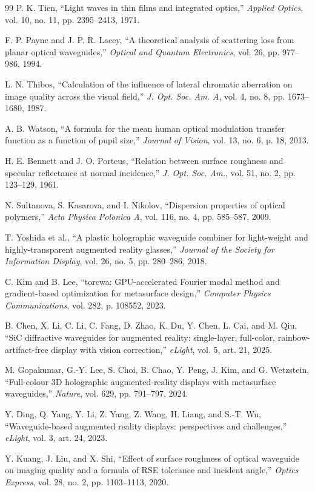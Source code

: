 \documentclass[10pt,twocolumn]{article}
\begin{document}
\begin{thebibliography}{99}
 P. K. Tien, ``Light waves in thin films and integrated optics,'' \emph{Applied Optics}, vol. 10, no. 11, pp. 2395--2413, 1971.

 F. P. Payne and J. P. R. Lacey, ``A theoretical analysis of scattering loss from planar optical waveguides,'' \emph{Optical and Quantum Electronics}, vol. 26, pp. 977--986, 1994.

 L. N. Thibos, ``Calculation of the influence of lateral chromatic aberration on image quality across the visual field,'' \emph{J. Opt. Soc. Am. A}, vol. 4, no. 8, pp. 1673--1680, 1987.

 A. B. Watson, ``A formula for the mean human optical modulation transfer function as a function of pupil size,'' \emph{Journal of Vision}, vol. 13, no. 6, p. 18, 2013.

 H. E. Bennett and J. O. Porteus, ``Relation between surface roughness and specular reflectance at normal incidence,'' \emph{J. Opt. Soc. Am.}, vol. 51, no. 2, pp. 123--129, 1961.

 N. Sultanova, S. Kasarova, and I. Nikolov, ``Dispersion properties of optical polymers,'' \emph{Acta Physica Polonica A}, vol. 116, no. 4, pp. 585--587, 2009.

 T. Yoshida et al., ``A plastic holographic waveguide combiner for light-weight and highly-transparent augmented reality glasses,'' \emph{Journal of the Society for Information Display}, vol. 26, no. 5, pp. 280--286, 2018.

 C. Kim and B. Lee, ``torcwa: GPU-accelerated Fourier modal method and gradient-based optimization for metasurface design,'' \emph{Computer Physics Communications}, vol. 282, p. 108552, 2023.

 B. Chen, X. Li, C. Li, C. Fang, D. Zhao, K. Du, Y. Chen, L. Cai, and M. Qiu, ``SiC diffractive waveguides for augmented reality: single-layer, full-color, rainbow-artifact-free display with vision correction,'' \emph{eLight}, vol. 5, art. 21, 2025.

 M. Gopakumar, G.-Y. Lee, S. Choi, B. Chao, Y. Peng, J. Kim, and G. Wetzstein, ``Full-colour 3D holographic augmented-reality displays with metasurface waveguides,'' \emph{Nature}, vol. 629, pp. 791--797, 2024.

 Y. Ding, Q. Yang, Y. Li, Z. Yang, Z. Wang, H. Liang, and S.-T. Wu, ``Waveguide-based augmented reality displays: perspectives and challenges,'' \emph{eLight}, vol. 3, art. 24, 2023.

 Y. Kuang, J. Liu, and X. Shi, ``Effect of surface roughness of optical waveguide on imaging quality and a formula of RSE tolerance and incident angle,'' \emph{Optics Express}, vol. 28, no. 2, pp. 1103--1113, 2020.

\end{thebibliography}
\end{document}
